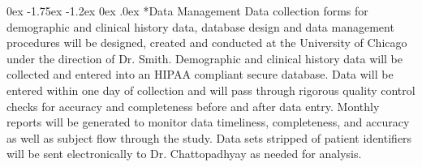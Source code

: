 \documentclass[onecolumn, compsoc,11pt]{IEEEtran}
\makeatletter
\renewcommand\section{\@startsection {section}{1}{\z@}%
                                   {-1pt \@plus -30ex \@minus 20ex}%
                                   {.1pt}%
                                   {\large\bfseries\scshape}}
\renewcommand\subsection{\@startsection {subsection}{2}{\z@}%
                                   {0ex \@plus -1.75ex \@minus -1.2ex}%
                                   {0ex \@plus.0ex}%
                                   {\fontsize{11}{11}\selectfont\bfseries\sffamily\color{black}}}
\makeatother
\begin{document}
\subsection*{Data Management} Data collection forms for demographic and clinical history data, database design and data
management procedures will be designed, created and conducted at the University of Chicago under the
direction of Dr. Smith. Demographic and clinical history data will be collected and entered into an HIPAA compliant secure database. Data will be entered within one day of collection and will pass
through rigorous quality control checks for accuracy and completeness before and after data entry.  Monthly reports will be generated  to monitor data timeliness, completeness, and
accuracy as well as subject flow through the study. Data sets stripped of patient identifiers will be sent
electronically to Dr. Chattopadhyay as needed for analysis.



\end{document}
